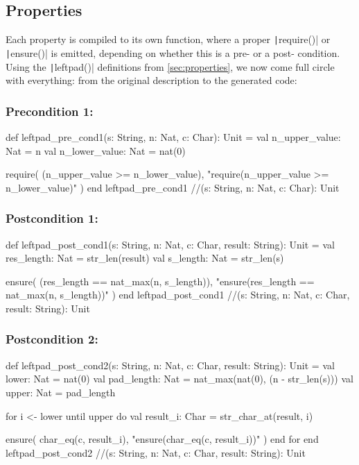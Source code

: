 \documentclass[11pt]{article}
\newcommand{\ScalaI}[1]{\texttt|#1|}
\begin{document}
\subsection{Properties}
Each property is compiled to its own function, where a proper \ScalaI{require()} or \ScalaI{ensure()} is emitted, depending on whether this is a pre- or a post- condition. Using the \ScalaI{leftpad()} definitions from \autoref{sec:properties}, we now come full circle with everything: from the original description to the generated code:

\subsubsection*{Precondition 1: \leftpadprea}
\begin{ScalaBlockSimple}
 def leftpad_pre_cond1(s: String, n: Nat, c: Char): Unit = 
  val n_upper_value: Nat = n
  val n_lower_value: Nat = nat(0)
  
  require(
    (n_upper_value >= n_lower_value),
    "require(n_upper_value >= n_lower_value)"
  )
end leftpad_pre_cond1 //(s: String, n: Nat, c: Char): Unit
\end{ScalaBlockSimple}


\subsubsection*{Postcondition 1: \leftpadposta}
\begin{ScalaBlockSimple}
def leftpad_post_cond1(s: String, n: Nat, c: Char, result: String): Unit = 
  val res_length: Nat = str_len(result)
  val s_length: Nat = str_len(s)
  
  ensure(
    (res_length == nat_max(n, s_length)),
    "ensure(res_length == nat_max(n, s_length))"
  )
end leftpad_post_cond1 //(s: String, n: Nat, c: Char, result: String): Unit
\end{ScalaBlockSimple}

\subsubsection*{Postcondition 2: \leftpadpostb}
\begin{ScalaBlockSimple}
def leftpad_post_cond2(s: String, n: Nat, c: Char, result: String): Unit = 
  val lower: Nat = nat(0)
  val pad_length: Nat = nat_max(nat(0), (n - str_len(s)))
  val upper: Nat = pad_length

  for i <- lower until upper do
    val result_i: Char = str_char_at(result, i)

    ensure(
      char_eq(c, result_i),
      "ensure(char_eq(c, result_i))"
    )
  end for
end leftpad_post_cond2 //(s: String, n: Nat, c: Char, result: String): Unit
\end{ScalaBlockSimple}
\end{document}

